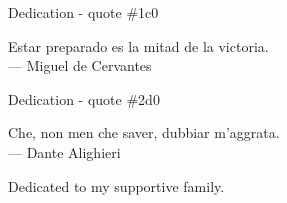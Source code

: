 \thispagestyle{empty}
{}

\vspace*{3cm}

\begin{ocg}{Dedication - quote \#1}{c}{0}

\begin{center}
    Estar preparado es la mitad de la victoria.\\ \medskip
    --- Miguel de Cervantes
\end{center}

\end{ocg}

\medskip

\begin{ocg}{Dedication - quote \#2}{d}{0}

\begin{center}
    Che, non men che saver, dubbiar m'aggrata.\\ \medskip
    --- Dante Alighieri
\end{center}

\end{ocg}

\bigskip

\begin{center}
    Dedicated to my supportive family.
\end{center}

